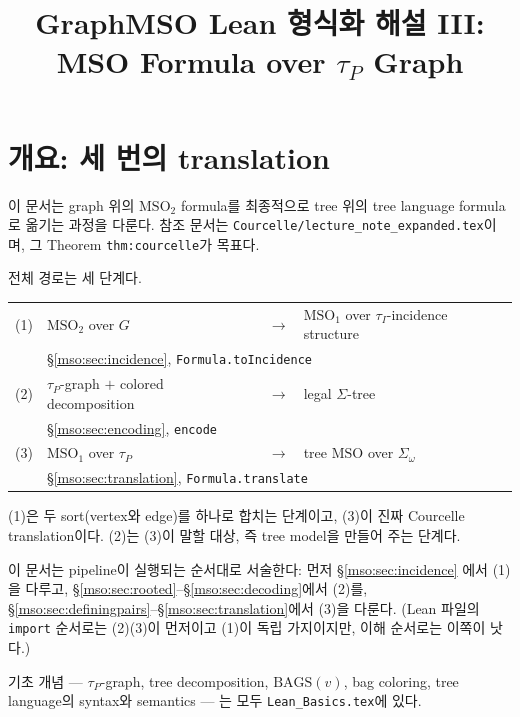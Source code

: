 \documentclass[11pt]{article}
\title{GraphMSO Lean 형식화 해설 III: \\ MSO Formula over \texorpdfstring{$\tau_P$}{tau P} Graph}
\author{}
\date{}
\theoremstyle{definition}
\theoremstyle{plain}
\newcommand{\MSO}{\mathrm{MSO}}
\newcommand{\MSOtwo}{\mathrm{MSO}_2}
\newcommand{\MSOone}{\mathrm{MSO}_1}
\newcommand{\lean}[1]{\texttt{#1}}
\newcommand{\leanfile}[1]{\texttt{#1}}
\newcommand{\BAGS}{\mathrm{BAGS}}
\begin{document}
\maketitle

\tableofcontents

\section{개요: 세 번의 translation}
\label{mso:sec:overview}

이 문서는 graph 위의 $\MSOtwo$ formula를 최종적으로 tree 위의 tree language
formula로 옮기는 과정을 다룬다. 참조 문서는
\leanfile{Courcelle/lecture\_note\_expanded.tex}이며, 그 Theorem
\lean{thm:courcelle}가 목표다.

전체 경로는 세 단계다.

\begin{center}
\begin{tabular}{clcl}
  (1) & $\MSOtwo$ over $G$ & $\longrightarrow$ & $\MSOone$ over $\tau_I$-incidence structure \\
      & \multicolumn{3}{l}{\quad \S\ref{mso:sec:incidence}, \lean{Formula.toIncidence}} \\[4pt]
  (2) & $\tau_P$-graph $+$ colored decomposition & $\longrightarrow$ & legal $\Sigma$-tree \\
      & \multicolumn{3}{l}{\quad \S\ref{mso:sec:encoding}, \lean{encode}} \\[4pt]
  (3) & $\MSOone$ over $\tau_P$ & $\longrightarrow$ & tree $\MSO$ over $\Sigma_\omega$ \\
      & \multicolumn{3}{l}{\quad \S\ref{mso:sec:translation}, \lean{Formula.translate}} \\
\end{tabular}
\end{center}

(1)은 두 sort(vertex와 edge)를 하나로 합치는 단계이고, (3)이 진짜 Courcelle
translation이다. (2)는 (3)이 말할 대상, 즉 tree model을 만들어 주는 단계다.

이 문서는 pipeline이 실행되는 순서대로 서술한다: 먼저 \S\ref{mso:sec:incidence}
에서 (1)을 다루고, \S\ref{mso:sec:rooted}--\S\ref{mso:sec:decoding}에서 (2)를,
\S\ref{mso:sec:definingpairs}--\S\ref{mso:sec:translation}에서 (3)을 다룬다.
(Lean 파일의 \lean{import} 순서로는 (2)(3)이 먼저이고 (1)이 독립 가지이지만,
이해 순서로는 이쪽이 낫다.)

기초 개념 --- $\tau_P$-graph, tree decomposition, $\BAGS(v)$, bag coloring,
tree language의 syntax와 semantics --- 는 모두
\leanfile{Lean\_Basics.tex}에 있다.
\end{document}
